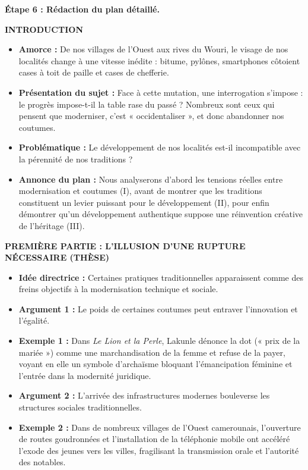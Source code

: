 \documentclass[11pt]{article}
\begin{document}
\begin{exoresolu}
\textbf{Étape 6 : Rédaction du plan détaillé.}

\medskip
\noindent\textbf{INTRODUCTION}
\begin{itemize}
\item \textbf{Amorce :} De nos villages de l'Ouest aux rives du Wouri, le visage de nos localités change à une vitesse inédite : bitume, pylônes, smartphones côtoient cases à toit de paille et cases de chefferie.
\item \textbf{Présentation du sujet :} Face à cette mutation, une interrogation s'impose : le progrès impose-t-il la table rase du passé ? Nombreux sont ceux qui pensent que moderniser, c'est « occidentaliser », et donc abandonner nos coutumes.
\item \textbf{Problématique :} Le développement de nos localités est-il incompatible avec la pérennité de nos traditions ?
\item \textbf{Annonce du plan :} Nous analyserons d'abord les tensions réelles entre modernisation et coutumes (I), avant de montrer que les traditions constituent un levier puissant pour le développement (II), pour enfin démontrer qu'un développement authentique suppose une réinvention créative de l'héritage (III).
\end{itemize}

\medskip
\noindent\textbf{PREMIÈRE PARTIE : L'ILLUSION D'UNE RUPTURE NÉCESSAIRE (THÈSE)}
\begin{itemize}
\item \textbf{Idée directrice :} Certaines pratiques traditionnelles apparaissent comme des freins objectifs à la modernisation technique et sociale.
\item \textbf{Argument 1 :} Le poids de certaines coutumes peut entraver l'innovation et l'égalité.
\item \textbf{Exemple 1 :} Dans \emph{Le Lion et la Perle}, Lakunle dénonce la dot (« prix de la mariée ») comme une marchandisation de la femme et refuse de la payer, voyant en elle un symbole d'archaïsme bloquant l'émancipation féminine et l'entrée dans la modernité juridique.
\item \textbf{Argument 2 :} L'arrivée des infrastructures modernes bouleverse les structures sociales traditionnelles.
\item \textbf{Exemple 2 :} Dans de nombreux villages de l'Ouest camerounais, l'ouverture de routes goudronnées et l'installation de la téléphonie mobile ont accéléré l'exode des jeunes vers les villes, fragilisant la transmission orale et l'autorité des notables.
\end{itemize}


\end{exoresolu}
\end{document}
